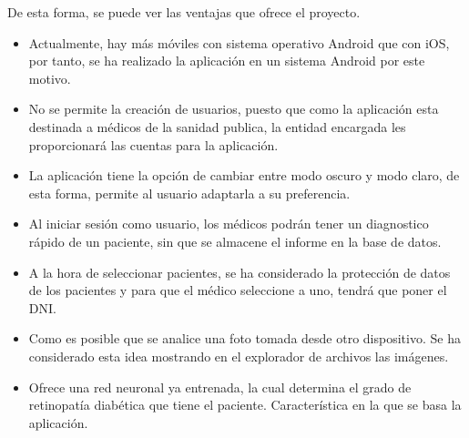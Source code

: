 De esta forma, se puede ver las ventajas que ofrece el proyecto.
\begin{itemize}
    \item Actualmente, hay más móviles con sistema operativo Android que con iOS, por tanto, se ha realizado la aplicación en un sistema Android por este motivo.
    \item No se permite la creación de usuarios, puesto que como la aplicación esta destinada a médicos de la sanidad publica, la entidad encargada les proporcionará las cuentas para la aplicación.
    \item La aplicación tiene la opción de cambiar entre modo oscuro y modo claro, de esta forma, permite al usuario adaptarla a su preferencia.
    \item Al iniciar sesión como usuario, los médicos podrán tener un diagnostico rápido de un paciente, sin que se almacene el informe en la base de datos.
    \item A la hora de seleccionar pacientes, se ha considerado la protección de datos de los pacientes y para que el médico seleccione a uno, tendrá que poner el DNI.
    \item Como es posible que se analice una foto tomada desde otro dispositivo. Se ha considerado esta idea mostrando en el explorador de archivos las imágenes.
    \item Ofrece una red neuronal ya entrenada, la cual determina el grado de retinopatía diabética que tiene el paciente. Característica en la que se basa la aplicación.
    
\end{itemize}
